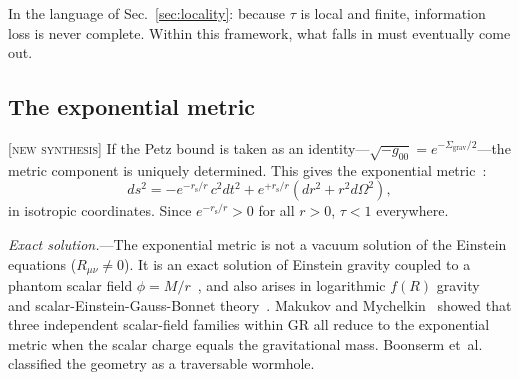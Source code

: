\documentclass[prl,twocolumn,superscriptaddress,longbibliography,floatfix]{revtex4-2}
\newcommand{\tauasym}{\tau}
\newcommand{\rs}{r_{\mathrm{s}}}
\newcommand{\Sgrav}{\Sigma_{\mathrm{grav}}}
\begin{document}
In the language of Sec.~\ref{sec:locality}: because
$\tauasym$ is local and finite, information loss is
never complete.
Within this framework, what falls in must eventually come out.

\subsection{The exponential metric}

[\textsc{new synthesis}]
If the Petz bound is taken as an identity---$\sqrt{-g_{00}}
= e^{-\Sgrav/2}$---the metric component is uniquely
determined.
This gives the exponential
metric~\cite{Papapetrou1954,Yilmaz1958}:
\begin{equation}
  ds^2 = -e^{-\rs/r}\, c^2 dt^2
       + e^{+\rs/r}\!\left(dr^2 + r^2 d\Omega^2\right),
  \label{eq:exp_metric}
\end{equation}
in isotropic coordinates.
Since $e^{-\rs/r} > 0$ for all $r > 0$,
$\tauasym < 1$ everywhere.

\emph{Exact solution.}---The exponential metric is not a vacuum
solution of the Einstein equations ($R_{\mu\nu} \neq 0$).
It is an exact solution of Einstein gravity coupled to a phantom
scalar field $\phi = M/r$~\cite{ErnazarovIvashchuk2026}, and
also arises in logarithmic $f(R)$
gravity~\cite{NathSarma2025} and
scalar-Einstein-Gauss-Bonnet theory~\cite{Ernazarov2025}.
Makukov and Mychelkin~\cite{Makukov2020} showed that three
independent scalar-field families within GR all reduce to
the exponential metric when the scalar charge equals the
gravitational mass.
Boonserm et~al.~\cite{Boonserm2018} classified the geometry as
a traversable wormhole.
\end{document}
